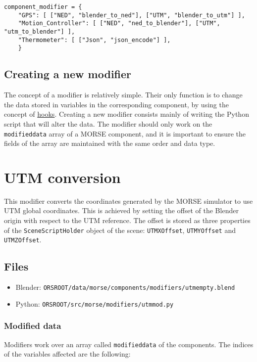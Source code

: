 \documentclass[twoside,a4paper,10pt]{report}
\newcommand{\dokutitlelevelone}[1]{\chapter{#1}}
\newcommand{\dokutitleleveltwo}[1]{\section{#1}}
\newcommand{\dokutitleleveltree}[1]{\subsection{#1}}
\newcommand{\dokumonospace}[1]{\texttt{#1}}
\newcommand{\dokuitem}{\item}
\begin{document}
\lstset{language=python}
\begin{lstlisting}
component_modifier = {
	"GPS": [ ["NED", "blender_to_ned"], ["UTM", "blender_to_utm"] ],
	"Motion_Controller": [ ["NED", "ned_to_blender"], ["UTM", "utm_to_blender"] ],
	"Thermometer": [ ["Json", "json_encode"] ],
	}

\end{lstlisting}

\dokutitleleveltwo{Creating a new modifier}
\label{2f5deef38336990fa7f864f2028d68a9}%

The concept of a modifier is relatively simple. Their only function is to change the data stored in variables in the corresponding component, by using the concept of \hyperref[4e819c837d54a6ed09abc77a8560a66f]{hooks}. Creating a new modifier consists mainly of writing the Python script that will alter the data. The modifier should only work on the \dokumonospace{modified{\textunderscore}data} array of a MORSE component, and it is important to ensure the fields of the array are maintained with the same order and data type.


\dokutitlelevelone{UTM conversion}
\label{df94310d1616e05688abb99eb76758dc}%
\label{b32d6491ce03dd4e6c877f3bfd9ff07e}%
This modifier converts the coordinates generated by the MORSE simulator to use UTM global coordinates. This is achieved by setting the offset of the Blender origin with respect to the UTM reference. The offset is stored as three properties of the \dokumonospace{Scene{\textunderscore}Script{\textunderscore}Holder} object of the scene: \dokumonospace{UTMXOffset}, \dokumonospace{UTMYOffset} and \dokumonospace{UTMZOffset}.


\dokutitleleveltwo{Files}
\label{45b963397aa40d4a0063e0d85e4fe7a1}%

\begin{itemize}
\dokuitem  Blender: \dokumonospace{{\textdollar}ORS{\textunderscore}ROOT/data/morse/components/modifiers/utm{\textunderscore}empty.blend}
\dokuitem  Python: \dokumonospace{{\textdollar}ORS{\textunderscore}ROOT/src/morse/modifiers/utm{\textunderscore}mod.py}
\end{itemize}

\dokutitleleveltree{Modified data}
\label{c1a1a093b7ca2545d0d88cac0ff8ccf6}%
Modifiers work over an array called \dokumonospace{modified{\textunderscore}data} of the components.
The indices of the variables affected are the following:
\end{document}
